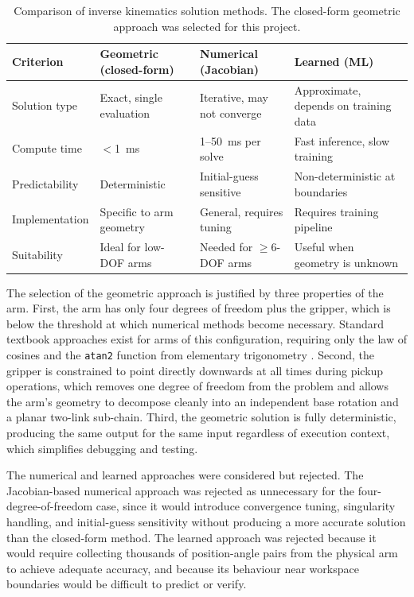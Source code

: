 \begin{table}[H]
    \centering
    \renewcommand{\arraystretch}{1.3}
    \begin{tabular}{|p{3.0cm}|p{3.5cm}|p{3.5cm}|p{3.5cm}|}
        \hline
        \textbf{Criterion} & \textbf{Geometric (closed-form)} & 
        \textbf{Numerical (Jacobian)} & \textbf{Learned (ML)} \\
        \hline
        Solution type & 
        Exact, single evaluation & 
        Iterative, may not converge & 
        Approximate, depends on training data \\
        \hline
        Compute time & 
        $<$1~ms & 
        1--50~ms per solve & 
        Fast inference, slow training \\
        \hline
        Predictability & 
        Deterministic & 
        Initial-guess sensitive & 
        Non-deterministic at boundaries \\
        \hline
        Implementation & 
        Specific to arm geometry & 
        General, requires tuning & 
        Requires training pipeline \\
        \hline
        Suitability & 
        Ideal for low-DOF arms & 
        Needed for $\geq$6-DOF arms & 
        Useful when geometry is unknown \\
        \hline
    \end{tabular}
    \caption{Comparison of inverse kinematics solution methods. The 
    closed-form geometric approach was selected for this project.}
\end{table}

The selection of the geometric approach is justified by three 
properties of the arm. First, the arm has only four degrees of 
freedom plus the gripper, which is below the threshold at which 
numerical methods become necessary. Standard textbook approaches 
exist for arms of this configuration, requiring only the law of 
cosines and the \texttt{atan2} function from elementary 
trigonometry \cite{craig2005}. Second, the gripper is constrained 
to point directly downwards at all times during pickup operations, 
which removes one degree of freedom from the problem and allows 
the arm's geometry to decompose cleanly into an independent base 
rotation and a planar two-link sub-chain. Third, the geometric 
solution is fully deterministic, producing the same output for 
the same input regardless of execution context, which simplifies 
debugging and testing.

The numerical and learned approaches were considered but rejected. 
The Jacobian-based numerical approach was rejected as unnecessary 
for the four-degree-of-freedom case, since it would introduce 
convergence tuning, singularity handling, and initial-guess 
sensitivity without producing a more accurate solution than the 
closed-form method. The learned approach was rejected because it 
would require collecting thousands of position-angle pairs from 
the physical arm to achieve adequate accuracy, and because its 
behaviour near workspace boundaries would be difficult to predict 
or verify.

